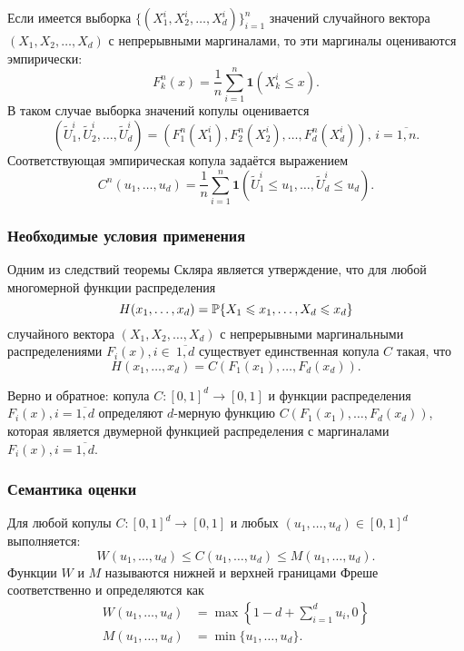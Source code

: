 Если имеется выборка $\{(X_1^i, X_2^i,\ldots, X_d^i)\}_{i=1}^n $ значений случайного вектора $(X_1, X_2, \ldots, X_d)$ с непрерывными маргиналами, то эти маргиналы оцениваются эмпирически:
\begin{equation}
	F_k^n(x) = \frac{1}{n} \sum_{i = 1}^n \mathbf{1}(X_k^i \leq x).
\end{equation}
В таком случае выборка значений копулы оценивается
\begin{equation}
	(\widetilde{U}_1^i, \widetilde{U}_2^i, \ldots, \widetilde{U}_d^i)=(F_1^n(X_1^i),F_2^n(X_2^i),\dots,F_d^n(X_d^i)), \, i = \overline{1, n}.
\end{equation}
Соответствующая эмпирическая копула задаётся выражением
\begin{equation}
	C^n(u_1, \ldots, u_d) = \frac{1}{n} \sum_{i = 1}^n \mathbf{1}(\widetilde{U}_1^i \leq u_1, \ldots, \widetilde{U}_d^i \leq u_d).
\end{equation}

\subsubsection*{Необходимые условия применения}
Одним из следствий теоремы Скляра является утверждение, что для любой многомерной функции распределения
\begin{equation}
	H(x_1, \ldots, x_d) = \P\{X_1 \leq x_1, \ldots, X_d \leq x_d\}
\end{equation}
случайного вектора $(X_1, X_2, \ldots, X_d)$ с непрерывными маргинальными распределениями $F_i(x), i \in~\overline{1, d}$ существует единственная копула $C$ такая, что
\begin{equation}
	H(x_1, \ldots, x_d) = C(F_1(x_1), \ldots, F_d(x_d)).
\end{equation}

Верно и обратное: копула $C: [0, 1]^d \rightarrow [0, 1]$ и функции распределения $F_i(x), i = \overline{1, d}$ определяют $d$-мерную функцию $C(F_1(x_1), \ldots, F_d(x_d))$, которая является двумерной функцией распределения с маргиналами $F_i(x), i = \overline{1, d}$.
\subsubsection*{Семантика оценки}
Для любой копулы $C: [0, 1]^d \rightarrow [0, 1]$ и любых $(u_1, \ldots, u_d) \in [0, 1]^d$ выполняется:
\begin{equation}
	W(u_1, \ldots, u_d) \leq C(u_1, \ldots, u_d) \leq M(u_1, \ldots, u_d).
\end{equation}
Функции $W$ и $M$ называются нижней и верхней границами Фреше соответственно и определяются как
\begin{align}
	W(u_1, \ldots, u_d) &= \max\left\{1 - d + \sum_{i = 1}^d {u_i} , 0 \right\} \\
	M(u_1, \ldots, u_d) &= \min \{u_1, \dots, u_d\}.
\end{align}

